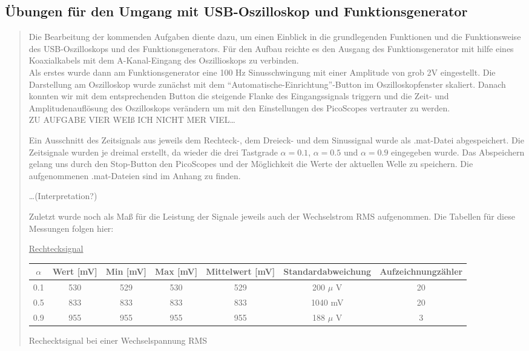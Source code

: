 	\subsection{Übungen für den Umgang mit USB-Oszilloskop und Funktionsgenerator}	
	\begin{quote}
	
	Die Bearbeitung der kommenden Aufgaben diente dazu, um einen Einblick in die
	grundlegenden Funktionen und die Funktionsweise des USB-Oszilloskops und des
	Funktionsgenerators. Für den Aufbau reichte es den Ausgang des
	Funktionsgenerator mit hilfe eines Koaxialkabels mit dem A-Kanal-Eingang des Oszillioskops 
	zu verbinden.\\
	
	Als erstes wurde dann am Funktionsgenerator eine 100 Hz
	Sinusschwingung mit einer Amplitude von grob 2V eingestellt. Die Darstellung am
	Oszilloskop wurde zunächst mit dem ``Automatische-Einrichtung''-Button im
	Oszilloskopfenster skaliert. Danach konnten wir mit dem entsprechenden Button
	die steigende Flanke des Eingangssignals triggern und die Zeit- und
	Amplitudenauflösung des Oszilloskops verändern um mit den Einstellungen des
	PicoScopes vertrauter zu werden.\\
	
	ZU AUFGABE VIER WEIß ICH NICHT MER VIEL\ldots
	
	Ein Ausschnitt des Zeitsignals aus jeweils dem Rechteck-, dem Dreieck- und dem
	Sinussignal wurde als .mat-Datei abgespeichert. Die Zeitsignale wurden je
	dreimal erstellt, da wieder die drei Tastgrade $\alpha = 0.1$, $\alpha =
	0.5$ und $\alpha = 0.9$ eingegeben wurde. Das Abspeichern gelang uns durch den
	Stop-Button den PicoScopes und der Möglichkeit die Werte der aktuellen Welle zu speichern. 
	Die aufgenommenen .mat-Dateien sind im Anhang zu finden.
	
	\ldots (Interpretation?)
	
	Zuletzt wurde noch als Maß für die Leistung der Signale jeweils auch der
	Wechselstrom RMS aufgenommen. Die Tabellen für diese Messungen folgen hier:
	
	\underline{Rechtecksignal}
		
			\hspace{-4em}
                  \begin{tabular}{|c|c|c|c|c|c|c|}
                  \hline
                   $\alpha $ & Wert [mV] & Min [mV] & Max [mV] & Mittelwert
                   [mV] & Standardabweichung & Aufzeichnungzähler\\ \hline 
                   0.1 & 530 & 529 & 530 & 529 & 200 $\mu$ V & 20 \\ \hline
                   0.5 & 833 & 833 & 833 & 833 & 1040 mV & 20 \\ \hline
                   0.9 & 955 & 955 & 955 & 955 & 188 $\mu$ V & 3 \\ \hline           
                 \end{tabular}
                       \caption{Rechecktsignal bei einer Wechselspannung RMS}
                        \label{tablelabel1}
        

\end{quote}
